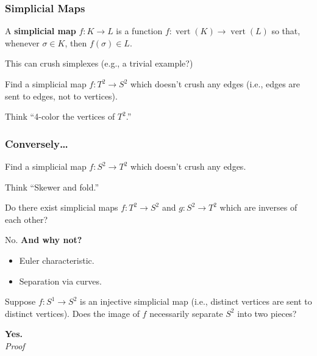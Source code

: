 \documentclass[14pt]{beamer}
\DeclareMathOperator{\vertices}{vert}
\begin{document}
\begin{frame}
  \frametitle{Simplicial Maps}
  A \textbf{simplicial map} $f : K \to L$ is a function $f : \vertices(K) \to \vertices(L)$ so that, \\
  whenever $\sigma \in K$, then $f(\sigma) \in L$.

  \vspace{1ex}
  \pause
  This can crush simplexes \pause (e.g., a trivial example?)
  \pause

  \begin{problem}
    Find a simplicial map $f : T^2 \to S^2$ which doesn't crush any edges (i.e., edges are sent to edges, not to vertices).
  \end{problem}
  \pause
  Think ``4-color the vertices of $T^2$.''
\end{frame}

\begin{frame}
\frametitle{Conversely\ldots}

\begin{problem}
  Find a simplicial map $f : S^2 \to T^2$ which doesn't crush any edges.
\end{problem}
\pause
Think ``Skewer and fold.''

\end{frame}

\begin{frame}
\begin{problem}
 Do there exist simplicial maps $f : T^2 \to S^2$ and $g : S^2 \to T^2$ which are inverses of each other?
\end{problem}

\pause

No.  \textbf{And why not?}

\pause
\begin{itemize}
\item Euler characteristic.
\pause\item Separation via curves.
\end{itemize}

\end{frame}

\begin{frame}
\begin{problem}
  Suppose $f : S^1 \to S^2$ is an injective simplicial map (i.e.,
  distinct vertices are sent to distinct vertices).  Does the image of
  $f$ necessarily separate $S^2$ into two pieces?
\end{problem}
\pause
\textbf{Yes.}\\
\pause
\textit{Proof}
\end{frame}
\end{document}
